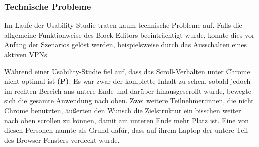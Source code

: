 \subsubsection{Technische Probleme}
Im Laufe der Usability-Studie traten kaum technische Probleme auf. Falls die allgemeine Funktionweise des Block-Editors beeinträchtigt wurde, konnte dies vor Anfang der Szenarios gelöst werden, beispielsweise durch das Ausschalten eines aktiven \acs{VPN}s.

Während einer Usability-Studie fiel auf, dass das Scroll-Verhalten unter Chrome nicht optimal ist \textbf{(P)}. Es war zwar der komplette Inhalt zu sehen, sobald jedoch im rechten Bereich ans untere Ende und darüber hinausgescrollt wurde, bewegte sich die gesamte Anwendung nach oben. Zwei weitere Teilnehmer:innen, die nicht Chrome benutzten, äußerten den Wunsch die Zielstruktur ein bisschen weiter nach oben scrollen zu können, damit am unteren Ende mehr Platz ist. Eine von diesen Personen nannte als Grund dafür, dass auf ihrem Laptop der untere Teil des Browser-Fensters verdeckt wurde.
